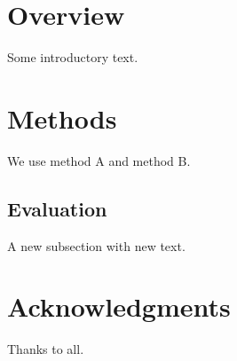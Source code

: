 \documentclass{article}
\begin{document}
\tableofcontents
\section{Overview}
Some introductory text.
\section{Methods}
We use method A and method B.
\subsection{Evaluation}
A new subsection with new text.
\section*{Acknowledgments}
Thanks to all.
\end{document}

